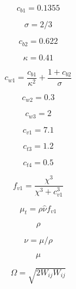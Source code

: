 \begin{equation}
c_{b1} = 0.1355
\end{equation}

\begin{equation}
\sigma = 2/3
\end{equation}

\begin{equation}
c_{b2} = 0.622
\end{equation}

\begin{equation}
\kappa = 0.41
\end{equation}

\begin{equation}
c_{w1} = \frac{c_{b1}}{\kappa^2} + \frac{1+c_{b2}}{\sigma}
\end{equation}

\begin{equation}
c_{w2} = 0.3
\end{equation}

\begin{equation}
c_{w3} = 2
\end{equation}

\begin{equation}
c_{v1} = 7.1
\end{equation}

\begin{equation}
c_{t3} = 1.2
\end{equation}

\begin{equation}
c_{t4} = 0.5
\end{equation}

\begin{equation}
f_{v1} = \frac{\chi^3}{\chi^3+c_{v1}^3}
\end{equation}

\begin{equation}
\mu_t = \rho \hat \nu f_{v1}
\end{equation}

\begin{equation}
\rho
\end{equation}

\begin{equation}
\nu = \mu/\rho
\end{equation}

\begin{equation}
\mu
\end{equation}

\begin{equation}
\Omega = \sqrt{2 W_{ij} W_{ij} }
\end{equation}

